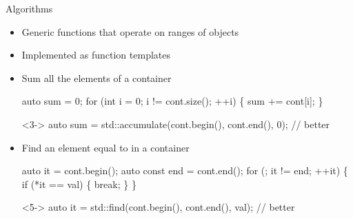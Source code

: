 \begin{frame}[fragile]{Algorithms}

  \begin{itemize}
  \item Generic functions that operate on \alert{ranges} of objects
  \item Implemented as function templates
  \end{itemize}

  \begin{itemize}
  \item<2-> Sum all the elements of a container 
    \begin{codeblock}
auto sum = 0;
for (int i = 0; i != cont.size(); ++i) \{
  sum += cont[i];
\}\end{codeblock}

    \begin{codeblock}<3->{
auto sum = std::accumulate(cont.begin(), cont.end(), 0); // better}\end{codeblock}

  \item<4-> Find an element equal to  in a container 
    \begin{codeblock}
auto it = cont.begin();
auto const end = cont.end();
for (; it != end; ++it) \{
  if (*it == val) \{
    break;
  \}
\}\end{codeblock}

    \begin{codeblock}<5->{
auto it = std::find(cont.begin(), cont.end(), val); // better}\end{codeblock}

  \end{itemize}
\end{frame}

